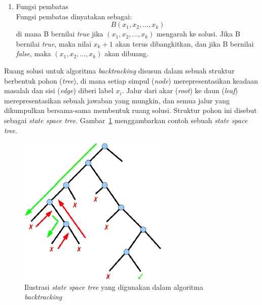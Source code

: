 \begin{enumerate}
\item Fungsi pembatas
\\ Fungsi pembatas dinyatakan sebagai:
\begin{displaymath}
B(x_1, x_2, ..., x_k)
\end{displaymath}
di mana B bernilai \textit{true} jika \begin{math}(x_1, x_2, ..., x_k)\end{math} mengarah ke solusi. Jika B bernilai \textit{true}, maka nilai \begin{math}x_k+1\end{math} akan terus dibangkitkan, dan jika B bernilai \textit{false}, maka \begin{math}(x_1, x_2, ..., x_k)\end{math} akan dibuang.
\end{enumerate}

Ruang solusi untuk algoritma \textit{backtracking} disusun dalam sebuah struktur berbentuk pohon (\textit{tree}), di mana setiap simpul (\textit{node}) merepresentasikan keadaan masalah dan sisi (\textit{edge}) diberi label \begin{math}x_i\end{math}. Jalur dari akar (\textit{root}) ke daun (\textit{leaf}) merepresentasikan sebuah jawaban yang mungkin, dan semua jalur yang dikumpulkan bersama-sama membentuk ruang solusi. Struktur pohon ini disebut sebagai \textit{state space tree}. Gambar~\ref{fig:backtracking3} menggambarkan contoh sebuah \textit{state space tree}.

\begin{figure}
\centering
\captionsetup{justification=centering}
\includegraphics[scale=1]{Gambar/Backtracking3}
\caption[Ilustrasi \textit{state space tree} yang digunakan dalam algoritma  \textit{backtracking}  ~\cite{fahda:16:backtracking}]{Ilustrasi \textit{state space tree} yang digunakan dalam algoritma  \textit{backtracking} ~\cite{fahda:16:backtracking}}
\label{fig:backtracking3}
\end{figure}

